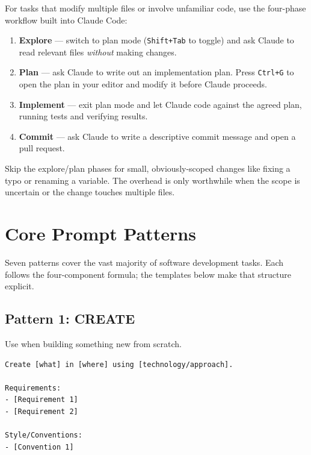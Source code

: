 
For tasks that modify multiple files or involve unfamiliar code, use the
four-phase workflow built into Claude Code:

\begin{enumerate}
  \item \textbf{Explore} — switch to plan mode (\texttt{Shift+Tab} to toggle)
        and ask Claude to read relevant files \emph{without} making changes.
  \item \textbf{Plan} — ask Claude to write out an implementation plan. Press
        \texttt{Ctrl+G} to open the plan in your editor and modify it before
        Claude proceeds.
  \item \textbf{Implement} — exit plan mode and let Claude code against the
        agreed plan, running tests and verifying results.
  \item \textbf{Commit} — ask Claude to write a descriptive commit message and
        open a pull request.
\end{enumerate}

\begin{notebox}
Skip the explore/plan phases for small, obviously-scoped changes like fixing
a typo or renaming a variable. The overhead is only worthwhile when the scope
is uncertain or the change touches multiple files.
\end{notebox}

\section{Core Prompt Patterns}
\label{sec:prompt-patterns}


Seven patterns cover the vast majority of software development tasks. Each
follows the four-component formula; the templates below make that structure
explicit.

\subsection{Pattern 1: CREATE}

Use when building something new from scratch.

\begin{lstlisting}[caption={CREATE pattern template}]
Create [what] in [where] using [technology/approach].

Requirements:
- [Requirement 1]
- [Requirement 2]

Style/Conventions:
- [Convention 1]
\end{lstlisting}

